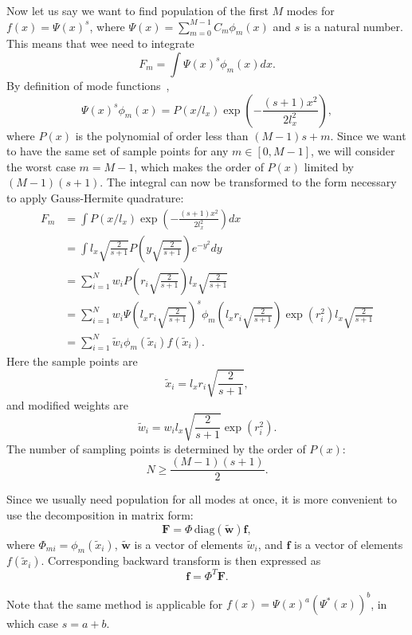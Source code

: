 Now let us say we want to find population of the first $M$ modes for $f(x) = \Psi(x)^s$,
where $\Psi(x) = \sum_{m=0}^{M-1} C_m \phi_m(x)$ and $s$ is a natural number.
This means that wee need to integrate
\[
	F_m = \int \Psi(x)^s \phi_m(x) dx.
\]
By definition of mode functions~,
\[
	\Psi(x)^s \phi_m(x) = P(x / l_x) \exp \left( -\frac{(s+1) x^2}{2 l_x^2} \right),
\]
where $P(x)$ is the polynomial of order less than $(M-1)s + m$.
Since we want to have the same set of sample points for any $m \in [0, M-1]$,
we will consider the worst case $m = M-1$,
which makes the order of $P(x)$ limited by $(M-1)(s+1)$.
The integral can now be transformed to the form necessary to apply Gauss-Hermite quadrature:
\begin{equation*}
\begin{split}
	F_m
	& = \int P(x / l_x) \exp \left( -\frac{(s+1) x^2}{2 l_x^2} \right) dx \\
	& = \int l_x \sqrt{\frac{2}{s+1}} P \left( y \sqrt{\frac{2}{s+1}} \right) e^{-y^2} dy \\
	& = \sum_{i=1}^N w_i P \left( r_i \sqrt{\frac{2}{s+1}} \right) l_x \sqrt{\frac{2}{s+1}} \\
	& = \sum_{i=1}^N w_i
		\Psi \left( l_x r_i \sqrt{\frac{2}{s+1}} \right)^s
		\phi_m \left( l_x r_i \sqrt{\frac{2}{s+1}} \right)
		\exp(r_i^2) l_x \sqrt{\frac{2}{s+1}} \\
	& = \sum_{i=1}^N \tilde{w}_i \phi_m(\tilde{x}_i) f(\tilde{x}_i).
\end{split}
\end{equation*}
Here the sample points are
\[
	\tilde{x}_i = l_x r_i \sqrt{\frac{2}{s+1}},
\]
and modified weights are
\[
	\tilde{w}_i = w_i l_x \sqrt{\frac{2}{s+1}} \exp(r_i^2).
\]
The number of sampling points is determined by the order of $P(x)$:
\[
	N \ge \frac{(M - 1)(s + 1)}{2}.
\]

Since we usually need population for all modes at once,
it is more convenient to use the decomposition in matrix form:
\[
	\bm{F} = \Phi\,\mathrm{diag}(\tilde{\bm{w}}) \bm{f},
\]
where $\Phi_{mi} = \phi_m(\tilde{x}_i)$,
$\tilde{\bm{w}}$ is a vector of elements $\tilde{w}_i$,
and $\bm{f}$ is a vector of elements $f(\tilde{x}_i)$.
Corresponding backward transform is then expressed as
\[
	\bm{f} = \Phi^T \bm{F}.
\]

Note that the same method is applicable for $f(x) = \Psi(x)^a (\Psi^*(x))^b$,
in which case $s = a + b$.
